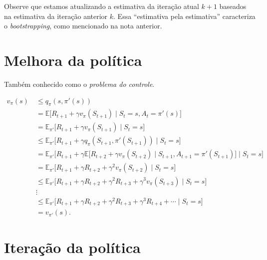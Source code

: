 \documentclass{article}
\begin{document}
            Observe que estamos atualizando a estimativa da iteração atual $k+1$ baseados na estimativa da iteração anterior $k$. Essa ``estimativa pela estimativa'' caracteriza o \emph{bootstrapping}, como mencionado na nota anterior.
        
    \section{Melhora da política}
    
        Também conhecido como o \textit{problema do controle}.
        
        \begin{equation}
            \label{eq:policy-improvement-theorem}
            \begin{split}
                v_{\pi}(s) 
                    & \ \le q_{\pi}(s, \pi'(s)) \\
                    & \ = \mathbb{E} \big[ R_{t+1} + \gamma v_{\pi}(S_{t+1}) \mid S_t = s, A_t = \pi'(s) \big] \\
                    & \ = \mathbb{E}_{\pi'} \big[ R_{t+1} + \gamma v_{\pi}(S_{t+1}) \mid S_t = s \big] \\
                    & \ \le \mathbb{E}_{\pi'} \big[ R_{t+1} + \gamma q_{\pi}(S_{t+1}, \pi'(S_{t+1})) \mid S_t = s \big] \\
                    & \ = \mathbb{E}_{\pi'} \Big[ R_{t+1} + \gamma \mathbb{E} \big[ R_{t+2} + \gamma v_{\pi} (S_{t+2}) \mid S_{t+1}, A_{t+1} = \pi'(S_{t+1}) \big] \mid S_t = s \Big] \\
                    & \ = \mathbb{E}_{\pi'} \big[ R_{t+1} + \gamma R_{t+2} + \gamma^2 v_{\pi}(S_{t+2}) \mid S_t = s \big] \\
                    & \ \le \mathbb{E}_{\pi'} \big[ R_{t+1} + \gamma R_{t+2} + \gamma^2 R_{t+3} + \gamma^3 v_{\pi}(S_{t+3}) \mid S_t = s \big] \\
                    & \ \vdots \\
                    & \ \le \mathbb{E}_{\pi'} \big[ R_{t+1} + \gamma R_{t+2} + \gamma^2 R_{t+3} + \gamma^3 R_{t+4} + \cdots \mid S_t = s \big] \\
                    & \ = v_{\pi'}(s) .
            \end{split}
        \end{equation}
    
    \section{Iteração da política}
    
\end{document}
